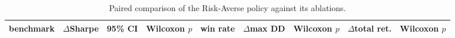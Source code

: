 \begin{table}[ht!]
\centering
\small
\begin{tabular}{lrrrrrrrr}
\hline
benchmark & $\Delta$Sharpe & 95\% CI & Wilcoxon $p$ & win rate & $\Delta$max DD & Wilcoxon $p$ & $\Delta$total ret. & Wilcoxon $p$ \\
\hline
\hline
\end{tabular}
\caption{Paired comparison of the Risk-Averse policy against its ablations.}
\label{tab:ablation_paired_partial}
\end{table}
